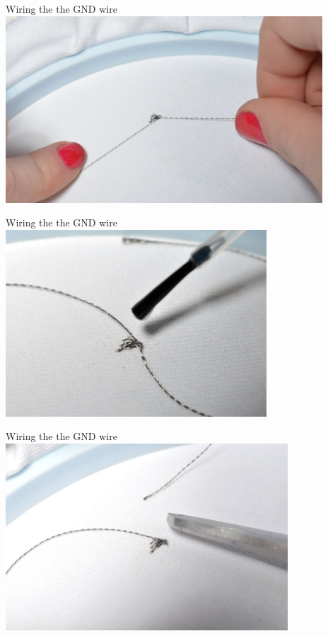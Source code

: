 \documentclass[aspectratio=169]{beamer}
\begin{document}
\begin{frame}[fragile]{Wiring the the GND wire}
\includegraphics[height=2.75in]{flora_DSC_0107.jpg}
\end{frame}
\begin{frame}[fragile]{Wiring the the GND wire}
\includegraphics[height=2.75in]{flora_DSC_0109.jpg}
\end{frame}
\begin{frame}[fragile]{Wiring the the GND wire}
\includegraphics[height=2.75in]{flora_DSC_0111.jpg}
\end{frame}
\end{document}
